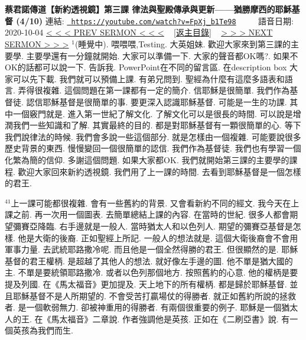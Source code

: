 \documentclass{book}
\begin{document}
\section{}
\label{sec:FpXj_b1Te98}
\textbf{蔡君諾傳道【新約透視鏡】第三課  律法與聖殿傳承與更新——猶勝摩西的耶穌基督 (4/10)}
\newline
\newline
連結: \href{https://youtube.com/watch?v=FpXj_b1Te98}{\texttt{ https://youtube.com/watch?v=FpXj\_b1Te98}} ~~~~ 語音日期: 2020-10-04 
\newline
\newline
\hyperref[sec:6Yg3FVlhsxs]{\small{< < < PREV SERMON < < <}}
~
\hyperref[sec:index]{\small{[返主目錄]}}
~
\hyperref[sec:meOlDsCMdvQ]{\small{> > > NEXT SERMON > > >}}
\newline
\newline
$^{1}$(睡覺中).
喂喂喂,Testing.
大英姐妹.
歡迎大家來到第三課的主要學.
主要學還有一分鐘就開始.
大家可以準備一下.
大家的聲音都OK嗎?.
如果不OK的話都可以說一下.
告訴我.
PowerPoint在不同的留言區.
在description box 大家可以先下載.
我們就可以預備上課.
有弟兄問到.
聖經為什麼有這麼多語表和語言.
弄得很複雜.
這個問題在第一課都有一定的簡介.
信耶穌是很簡單.
我們作為基督徒.
認信耶穌基督是很簡單的事.
要更深入認識耶穌基督.
可能是一生的功課.
其中一個竅門就是.
進入第一世紀了解文化.
了解文化可以是很長的時間.
可以說是增潤我們一些知識和了解.
其實最終的目的.
都是對耶穌基督有一顆很簡單的心.
等下我們說律法的時候.
我們會多說一些這個部分.
就是怎樣由一個複雜.
可能要說很多歷史背景的東西.
慢慢變回一個很簡單的認信.
我們作為基督徒.
我們也有學習一個化繁為簡的信仰.
多謝這個問題.
如果大家都OK.
我們就開始第三課的主要學的課程.
歡迎大家回來新約透視鏡.
我們用了上一課的時間.
去看到耶穌基督是一個怎樣的君王.

$^{41}$上一課可能都很複雜.
會有一些舊約的背景.
又會看新約不同的經文.
我今天在上課之前.
再一次用一個圖表.
去簡單總結上課的內容.
在當時的世紀.
很多人都會期望彌賽亞降臨.
右手邊就是一般人.
當時猶太人和以色列人.
期望的彌賽亞基督是怎樣.
他是大衛的後裔.
正如聖經上所記.
一般人的想法就是.
這個大衛後裔會不會用軍事力量.
去武統耶路撒冷呢.
而且他是一個全然得勝的君王.
但很顯然的是.
耶穌基督的君王權柄.
是超越了其他人的想法.
就好像左手邊的圖.
他不單是猶大國的主.
不單是要統領耶路撒冷.
或者以色列那個地方.
按照舊約的心意.
他的權柄是要提及列國.
在《馬太福音》更加提及.
天上地下的所有權柄.
都是歸於耶穌基督.
並且耶穌基督不是人所期望的.
不會受苦打贏場仗的得勝者.
就正如舊約所說的拯救者.
是一個軟弱無力.
卻被神重用的得勝者.
有兩個很重要的例子.
耶穌是一個猶太人的王.
在《馬太福音》二章說.
作者強調他是英孩.
正如在《二刷亞書》說.
有一個英孩為我們而生.
\end{document}
